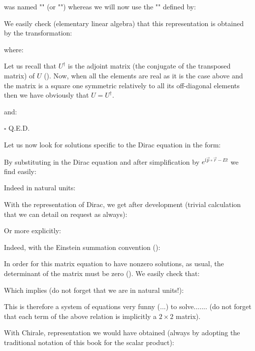 	was named "" (or "") whereas we will now use the "" defined by:
	
	We easily check (elementary linear algebra) that this representation is obtained by the transformation:
	
	where:
	
	Let us recall that $U^\dagger$ is the adjoint matrix (the conjugate of the transposed matrix) of $U$ (). Now, when all the elements are real as it is the case above and the matrix is a square one symmetric relatively to all its off-diagonal elements then we have obviously that $U=U^\dagger$.
	\begin{dem}
	
	and:
	
	\begin{flushright}
		$\square$  Q.E.D.
	\end{flushright}
	\end{dem}
	Let us now look for solutions specific to the Dirac equation in the form:
	
	By substituting in the Dirac equation and after simplification by $e^{\mathrm{i}\vec{p}\circ\vec{r}-Et}$ we find easily:
	
	Indeed in natural units:
	
	With the representation of Dirac, we get after development (trivial calculation that we can detail on request as always):
	
	Or more explicitly:
	
	Indeed, with the Einstein summation convention ():
	
	In order for this matrix equation to have nonzero solutions, as usual, the determinant of the matrix must be zero (). We easily check that:
	
	Which implies (do not forget that we are in natural units!):
	
	This is therefore a system of equations very funny (...) to solve....... (do not forget that each term of the above relation is implicitly a $2\times 2$ matrix).
	
	With Chirale, representation we would have obtained (always by adopting the traditional notation of this book for the scalar product):
	
